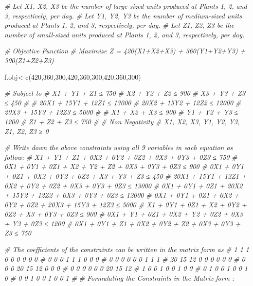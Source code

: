 \documentclass[
]{article}
\newenvironment{Shaded}{\begin{snugshade}}{\end{snugshade}}
\newcommand{\CommentTok}[1]{\textcolor[rgb]{0.56,0.35,0.01}{\textit{#1}}}
\newcommand{\DecValTok}[1]{\textcolor[rgb]{0.00,0.00,0.81}{#1}}
\newcommand{\FunctionTok}[1]{\textcolor[rgb]{0.00,0.00,0.00}{#1}}
\newcommand{\NormalTok}[1]{#1}
\newcommand{\OtherTok}[1]{\textcolor[rgb]{0.56,0.35,0.01}{#1}}
\begin{document}
\begin{Shaded}
\begin{Highlighting}[]
\CommentTok{\# Let X1, X2, X3 be the number of large{-}sized units produced at Plants 1, 2, and 3, respectively, per day.}
\CommentTok{\# Let Y1, Y2, Y3 be the number of medium{-}sized units produced at Plants 1, 2, and 3, respectively, per day.}
\CommentTok{\# Let Z1, Z2, Z3 be the number of small{-}sized units produced at Plants 1, 2, and 3, respectively, per day.}

\CommentTok{\# Objective Function}
\CommentTok{\# Maximize Z = 420(X1+X2+X3) + 360(Y1+Y2+Y3) + 300(Z1+Z2+Z3)}

\NormalTok{f.obj}\OtherTok{\textless{}{-}}\FunctionTok{c}\NormalTok{(}\DecValTok{420}\NormalTok{,}\DecValTok{360}\NormalTok{,}\DecValTok{300}\NormalTok{,}\DecValTok{420}\NormalTok{,}\DecValTok{360}\NormalTok{,}\DecValTok{300}\NormalTok{,}\DecValTok{420}\NormalTok{,}\DecValTok{360}\NormalTok{,}\DecValTok{300}\NormalTok{)}

\CommentTok{\# Subject to}
\CommentTok{\#   X1 + Y1 + Z1 ≤ 750}
\CommentTok{\#   X2 + Y2 + Z2 ≤ 900}
\CommentTok{\#   X3 + Y3 + Z3 ≤ 450}
\CommentTok{\# }
\CommentTok{\#   20X1 + 15Y1 + 12Z1 ≤ 13000}
\CommentTok{\#   20X2 + 15Y2 + 12Z2 ≤ 12000}
\CommentTok{\#   20X3 + 15Y3 + 12Z3 ≤ 5000}
\CommentTok{\# }
\CommentTok{\#   X1 + X2 + X3 ≤ 900}
\CommentTok{\#   Y1 + Y2 + Y3 ≤ 1200}
\CommentTok{\#   Z1 + Z2 + Z3 ≤ 750}
\CommentTok{\#   }
\CommentTok{\# Non Negativity}
\CommentTok{\#     X1, X2, X3, Y1, Y2, Y3, Z1, Z2, Z3 ≥ 0}

\CommentTok{\# Write down the above constraints using all 9 variables in each equation as follow:}
\CommentTok{\# X1 + Y1 + Z1 + 0X2 + 0Y2 + 0Z2 + 0X3 + 0Y3 + 0Z3 ≤ 750}
\CommentTok{\# 0X1 + 0Y1 + 0Z1 + X2 + Y2 + Z2 + 0X3 + 0Y3 + 0Z3 ≤ 900}
\CommentTok{\# 0X1 + 0Y1 + 0Z1 + 0X2 + 0Y2 + 0Z2 + X3 + Y3 + Z3 ≤ 450}
\CommentTok{\# 20X1 + 15Y1 + 12Z1 + 0X2 + 0Y2 + 0Z2 + 0X3 + 0Y3 + 0Z3 ≤ 13000}
\CommentTok{\# 0X1 + 0Y1 + 0Z1 + 20X2 + 15Y2 + 12Z2 + 0X3 + 0Y3 + 0Z3 ≤ 12000}
\CommentTok{\# 0X1 + 0Y1 + 0Z1 + 0X2 + 0Y2 + 0Z2 + 20X3 + 15Y3 + 12Z3 ≤ 5000}
\CommentTok{\# X1 + 0Y1 + 0Z1 + X2 + 0Y2 + 0Z2 + X3 + 0Y3 + 0Z3 ≤ 900}
\CommentTok{\# 0X1 + Y1 + 0Z1 + 0X2 + Y2 + 0Z2 + 0X3 + Y3 + 0Z3 ≤ 1200}
\CommentTok{\# 0X1 + 0Y1 + Z1 + 0X2 + 0Y2 + Z2 + 0X3 + 0Y3 + Z3 ≤ 750}

\CommentTok{\# The coefficients of the constraints can be written in the matrix form as}
\CommentTok{\#   1 1 1 0 0 0 0 0 0}
\CommentTok{\#   0 0 0 1 1 1 0 0 0}
\CommentTok{\#   0 0 0 0 0 0 1 1 1}
\CommentTok{\#   20 15 12 0 0 0 0 0 0}
\CommentTok{\#   0 0 0 20 15 12 0 0 0}
\CommentTok{\#   0 0 0 0 0 0 20 15 12}
\CommentTok{\#   1 0 0 1 0 0 1 0 0}
\CommentTok{\#   0 1 0 0 1 0 0 1 0}
\CommentTok{\#   0 0 1 0 0 1 0 0 1}
\CommentTok{\# }
\CommentTok{\# Formulating the Constraints in the Matrix form : }


\end{Highlighting}
\end{Shaded}
\end{document}
